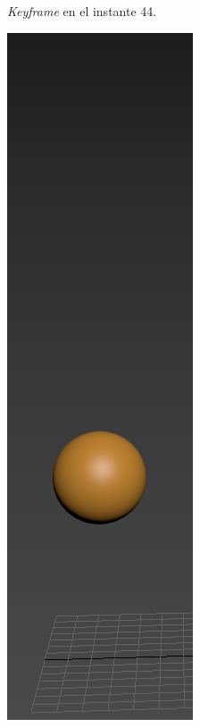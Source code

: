 \documentclass{article}
\begin{document}
\begin{figure}[H]
\begin{subfigure}[H]{0.15\textwidth}
	    \caption{\textit{Keyframe} en el instante 44.}
	\end{subfigure}
    \hfill
	\begin{subfigure}[H]{0.15\textwidth}
	    \centering
	    \includegraphics[width=\textwidth]{imagenes/Ejercicio 2/p1_48.png}

\end{subfigure}
\end{figure}
\end{document}
